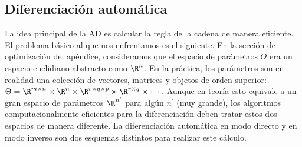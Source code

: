 \documentclass[../../book-main_es.tex]{subfiles}
\begin{document}
\subsection{Diferenciación automática}

La idea principal de la AD es calcular la regla de la cadena de manera eficiente.
El problema básico al que nos enfrentamos es el siguiente. En la
sección de optimización
del apéndice, consideramos
que el espacio de parámetros \(\Theta\) era un espacio euclidiano abstracto como
\(\R^{n}\). En la práctica, los parámetros son en realidad una colección de vectores,
matrices y objetos de orden superior: \(\Theta = \R^{m \times n} \times \R^{n}
\times \R^{r \times q \times p} \times \R^{r \times q} \times \cdots\). Aunque en
teoría esto equivale a un gran espacio de parámetros \(\R^{n^{\prime}}\) para
algún \(n^{\prime}\) (muy grande), los algoritmos computacionalmente eficientes
para la diferenciación deben tratar estos dos espacios de manera diferente.
La diferenciación automática en modo directo y en modo inverso son dos esquemas distintos para
realizar este cálculo.
\end{document}
